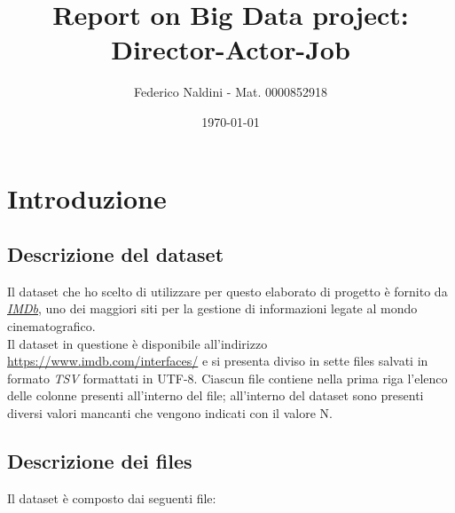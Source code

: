 \documentclass[hidelinks]{article}
\title{\textbf{Report on Big Data project: Director-Actor-Job}}
\author{
	Federico Naldini - Mat.  0000852918}
\date{\today}
\begin{document}
\maketitle
\newpage

\tableofcontents

\newpage

\section{Introduzione}
\subsection{Descrizione del dataset}
Il dataset che ho scelto di utilizzare per questo elaborato di progetto è fornito da \href{https://www.imdb.com/}{\textit{IMDb}}, uno dei maggiori siti per la gestione di informazioni legate al mondo cinematografico.\\
Il dataset in questione è disponibile all'indirizzo  \url{https://www.imdb.com/interfaces/} e si presenta diviso in sette files salvati in formato \textit{TSV} formattati in UTF-8. Ciascun file contiene nella prima riga l'elenco delle colonne presenti all'interno del file; all'interno del dataset sono presenti diversi valori mancanti che vengono indicati con il valore N.



\subsection{Descrizione dei files}

Il dataset è composto dai seguenti file:
\end{document}
